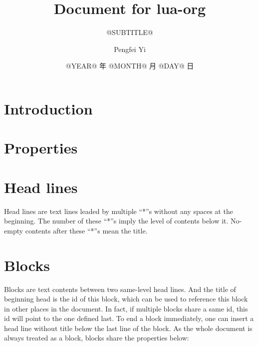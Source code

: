 \documentclass[8pt]{beamer}
\begin{document}

\title{Document for lua-org}
\subtitle{@SUBTITLE@}
\author{Pengfei Yi}
\date{@YEAR@ 年 @MONTH@ 月 @DAY@ 日}   %

{

\frame{  %
	\titlepage
}
}

\frame{  %
	\tableofcontents
}






\section{Introduction} \label{SEC:1}


\section{Properties} \label{SEC:2}


\section{Head lines} \label{SEC:3}
Head lines are text lines leaded by multiple ``*''s without any spaces at the beginning. The number of these ``*''s imply the level of contents below it. No-empty contents after these ``*''s mean the title.

\section{Blocks} \label{SEC:4}
Blocks are text contents between two same-level {\color{red}head lines}. And the title of beginning head is the {\color{red}id} of this block, which can be used to reference this block in other places in the document. In fact, if multiple blocks share a same {\color{red}id}, this id will point to the one defined last. To end a block immediately, one can insert a head line without title below  the last line of the block. As the whole document is always treated as a block, blocks share the properties below:
\end{document}
